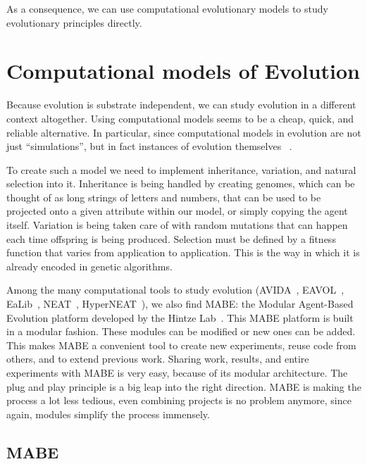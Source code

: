 \documentclass[12pt,oneside,listof=totoc,paper=a4,headings=small]{scrbook}
\begin{document}
As a consequence, we can use computational evolutionary models to study evolutionary principles directly. 

\chapter{Computational models of Evolution}
Because evolution is substrate independent, we can study evolution in a different context altogether. Using computational models seems to be a cheap, quick, and reliable alternative. In particular, since computational models in evolution are not just ``simulations'', but in fact instances of evolution themselves ~\cite{Pennock:2007iy}.

To create such a model we need to implement inheritance, variation, and natural selection into it. Inheritance is being handled by creating genomes, which can be thought of as long strings of letters and numbers, that can be used to be projected onto a given attribute within our model, or simply copying the agent itself. Variation is being taken care of with random mutations that can happen each time offspring is being produced. Selection must be defined by a fitness function that varies from application to application. This is the way in which it is already encoded in  genetic algorithms.

Among the many computational tools to study evolution (AVIDA~\cite{adami1994evolutionary}, EAVOL~\cite{knibbe2007long}, EaLib~\cite{dknoester2016ealib}, NEAT~\cite{stanley2002evolving}, HyperNEAT~\cite{gauci2007generating}), %
we also find MABE: the Modular Agent-Based Evolution platform developed by the Hintze Lab~\cite{MABE2016,bohm2017mabe}. This MABE platform is built in a modular fashion. These modules can be modified or new ones can be added. This makes MABE a convenient tool to create new experiments, reuse code from others, and to extend previous work. 
Sharing work, results, and entire experiments with MABE is very easy, because of its modular architecture. The plug and play principle is a big leap into the right direction. MABE is making the process a lot less tedious, even combining projects is no problem anymore, since again, modules simplify the process immensely.



\newpage
\section{MABE}
\end{document}
